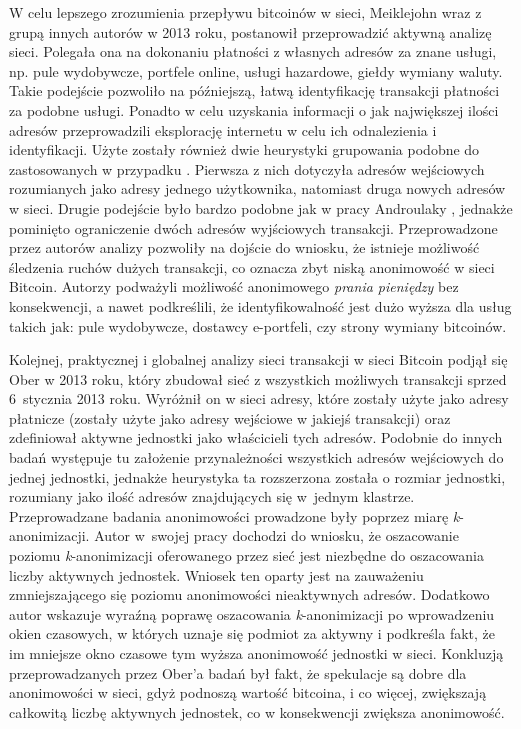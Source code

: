 \documentclass[12pt, twoside, final, openany]{mgr}
\begin{document}
\indent W celu lepszego zrozumienia przepływu bitcoinów w sieci, Meiklejohn wraz z grupą innych autorów w 2013 roku\cite{meiklejohn2013fistful}, postanowił  przeprowadzić aktywną analizę sieci. Polegała ona na dokonaniu płatności z własnych adresów za znane usługi, np. pule wydobywcze, portfele online, usługi hazardowe, giełdy wymiany waluty. Takie podejście pozwoliło na późniejszą, łatwą identyfikację transakcji płatności za podobne usługi. Ponadto w celu uzyskania informacji o jak największej ilości adresów przeprowadzili eksplorację internetu w celu ich odnalezienia i identyfikacji. Użyte zostały również dwie heurystyki grupowania podobne do zastosowanych w przypadku \cite{Reid2013, Androulaki2013, Ron2013}. Pierwsza z nich dotyczyła adresów wejściowych rozumianych jako adresy jednego użytkownika, natomiast druga nowych adresów w sieci. Drugie podejście było bardzo podobne jak w pracy Androulaky \cite{Androulaki2013}, jednakże pominięto ograniczenie dwóch adresów wyjściowych transakcji. Przeprowadzone przez autorów analizy pozwoliły na dojście do wniosku, że istnieje możliwość śledzenia ruchów dużych transakcji, co oznacza zbyt niską anonimowość w sieci Bitcoin. Autorzy podważyli możliwość anonimowego \textit{prania pieniędzy} bez konsekwencji, a nawet podkreślili, że identyfikowalność jest dużo wyższa dla usług takich jak: pule wydobywcze, dostawcy e-portfeli, czy strony wymiany bitcoinów.

\indent Kolejnej, praktycznej i globalnej analizy sieci transakcji w sieci Bitcoin podjął się Ober w 2013 roku\cite{Ober_2013}, który zbudował sieć z wszystkich możliwych transakcji sprzed 6~stycznia 2013 roku. Wyróżnił on w sieci adresy, które zostały użyte jako adresy płatnicze (zostały użyte jako adresy wejściowe w jakiejś transakcji) oraz zdefiniował aktywne jednostki jako właścicieli tych adresów. Podobnie do innych badań występuje tu założenie przynależności wszystkich adresów wejściowych do jednej jednostki, jednakże heurystyka ta rozszerzona została o rozmiar jednostki, rozumiany jako ilość adresów znajdujących się w~jednym klastrze. Przeprowadzane badania anonimowości prowadzone były poprzez miarę \textit{k}-anonimizacji. Autor w~swojej pracy dochodzi do wniosku, że oszacowanie poziomu \textit{k}-anonimizacji oferowanego przez sieć jest niezbędne do oszacowania liczby aktywnych jednostek. Wniosek ten oparty jest na zauważeniu zmniejszającego się poziomu anonimowości nieaktywnych adresów. Dodatkowo autor wskazuje wyraźną poprawę oszacowania \textit{k}-anonimizacji po wprowadzeniu okien czasowych, w których uznaje się podmiot za aktywny i podkreśla fakt, że im mniejsze okno czasowe tym wyższa anonimowość jednostki w sieci. Konkluzją przeprowadzanych przez Ober'a badań był fakt, że spekulacje są dobre dla anonimowości w sieci, gdyż podnoszą wartość bitcoina, i co więcej, zwiększają całkowitą liczbę aktywnych jednostek, co w konsekwencji zwiększa anonimowość.
\end{document}
